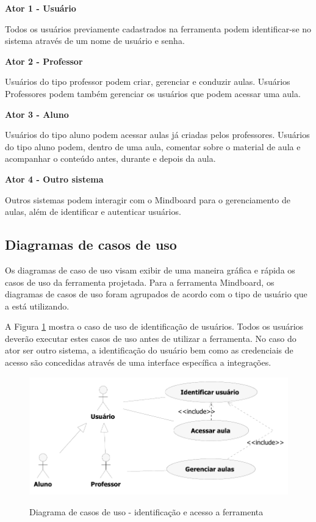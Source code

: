 \textbf{Ator 1 - Usuário}

Todos os usuários previamente cadastrados na ferramenta podem identificar-se no sistema através de um nome de usuário e senha.

\textbf{Ator 2 - Professor}

Usuários do tipo professor podem criar, gerenciar e conduzir aulas. Usuários Professores podem também gerenciar os usuários que podem acessar uma aula.

\textbf{Ator 3 - Aluno}

Usuários do tipo aluno podem acessar aulas já criadas pelos professores. Usuários do tipo aluno podem, dentro de uma aula, comentar sobre o material de aula e acompanhar o conteúdo antes, durante e depois da aula.

\textbf{Ator 4 - Outro sistema}

Outros sistemas podem interagir com o Mindboard para o gerenciamento de aulas, além de identificar e autenticar usuários.

\subsection{Diagramas de casos de uso}

Os diagramas de caso de uso visam exibir de uma maneira gráfica e rápida os casos de uso da ferramenta projetada. Para a ferramenta Mindboard, os diagramas de casos de uso foram agrupados de acordo com o tipo de usuário que a está utilizando. 

A Figura \ref{fig:use_case1} mostra o caso de uso de identificação de usuários. Todos os usuários deverão executar estes casos de uso antes de utilizar a ferramenta. No caso do ator ser outro sistema, a identificação do usuário bem como as credenciais de acesso são concedidas através de uma interface específica a integrações.
 
\begin{figure}[!h]
\centering
\caption{Diagrama de casos de uso - identificação e acesso a ferramenta}
\includegraphics[width=1.0\textwidth]{pdfs/img-use-case1.pdf} 
\label{fig:use_case1} 
\end{figure}

